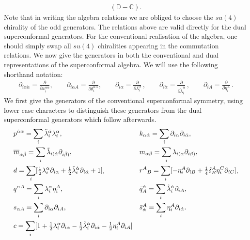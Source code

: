 \documentclass[12pt]{article}
\renewcommand{\a}{\alpha}
\newcommand{\da}{{\dot{\alpha}}}
\begin{document}
{\begin{align}
(\mathbb{D}-\mathbb{C}).
\end{align}
Note that in writing the algebra relations we are obliged to choose the $su(4)$ chirality of the odd generators. The relations above are valid directly for the dual superconformal generators. For the conventional realisation of the algebra, one should simply swap all $su(4)$ chiralities appearing in the commutation relations.
We now give the generators in both the conventional and dual representations of the superconformal
algebra. We will use the following shorthand notation:
\begin{align}
\partial_{i \alpha \dot{\alpha}} = \frac{\partial}{\partial
x_i^{\alpha \dot{\alpha}}}, \qquad \partial_{i \alpha A} = \frac{\partial}{\partial \theta_i^{\alpha
A}}, \qquad \partial_{i \alpha} = \frac{\partial}{\partial \lambda_i^{\alpha}}\,, \qquad
\partial_{i \dot{\alpha}} = \frac{\partial}{\partial
    \tilde{\lambda}_i^{\dot{\alpha}}}\,, \qquad
\partial_{i A} = \frac{\partial}{\partial \eta_i^A}\,.
\end{align}
We first give the generators of the conventional superconformal symmetry, using lower case
characters to distinguish these generators from the dual superconformal generators which follow
afterwards.
\begin{align}
& p^{\dot{\alpha}\alpha }  =  \sum_i \tilde{\lambda}_i^{\dot{\alpha}}\lambda_i^{\alpha} , & &
k_{\alpha \dot{\alpha}} = \sum_i \partial_{i \alpha} \partial_{i \dot{\alpha}},\notag\\
&\overline{m}_{\dot{\alpha} \dot{\beta}} = \sum_i \tilde{\lambda}_{i (\dot{\alpha}} \partial_{i
\dot{\beta} )}, & & m_{\alpha \beta} = \sum_i \lambda_{i (\alpha} \partial_{i \beta )}
,\notag\\
& d =  \sum_i [\tfrac{1}{2}\lambda_i^{\alpha} \partial_{i \alpha} +\tfrac{1}{2}
\tilde{\lambda}_i^{\dot{\alpha}} \partial_{i
    \dot{\alpha}} +1], & & r^{A}{}_{B} = \sum_i [-\eta_i^A \partial_{i B} + \tfrac{1}{4}\delta^A_B \eta_i^C \partial_{i C}],\notag\\
&q^{\alpha A} =  \sum_i \lambda_i^{\alpha} \eta_i^A, &&   \bar{q}^{\dot\alpha}_A
= \sum_i \tilde\lambda_i^\da \partial_{i A}, \notag\\
& s_{\alpha A} =  \sum_i \partial_{i \alpha} \partial_{i A}, & &
\bar{s}_{\dot\alpha}^A = \sum_i \eta_i^A \partial_{i \dot\alpha}.\notag\\
&c = \sum_i [1 + \tfrac{1}{2} \lambda_i^{\a} \partial_{i \a} - \tfrac{1}{2} \tilde\lambda_i^{\da} \partial_{i \da} - \tfrac{1}{2} \eta_i^A \partial_{iA} ]
\end{align}
}
\end{document}
